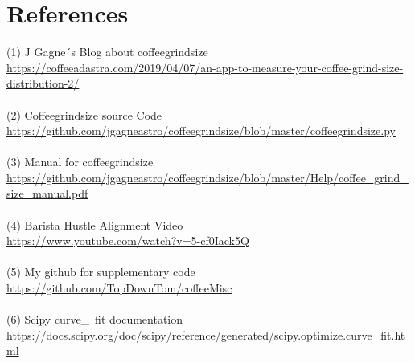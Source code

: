 \documentclass[10pt,a4paper,twocolumn,notitlepage]{article}
\begin{document}
\section{References}
(1) J Gagne\'\ s Blog about coffeegrindsize\\
\url{https://coffeeadastra.com/2019/04/07/an-app-to-measure-your-coffee-grind-size-distribution-2/}\\\\
(2) Coffeegrindsize source Code\\
\url{https://github.com/jgagneastro/coffeegrindsize/blob/master/coffeegrindsize.py}\\\\
(3) Manual for coffeegrindsize\\
\url{https://github.com/jgagneastro/coffeegrindsize/blob/master/Help/coffee_grind_size_manual.pdf}\\\\
(4) Barista Hustle Alignment Video\\
\url{https://www.youtube.com/watch?v=5-cf0Iack5Q}\\\\
(5) My github for supplementary code\\
\url{https://github.com/TopDownTom/coffeeMisc}\\\\
(6) Scipy curve\_\ fit documentation\\
\url{https://docs.scipy.org/doc/scipy/reference/generated/scipy.optimize.curve_fit.html}\\\\
\end{document}
